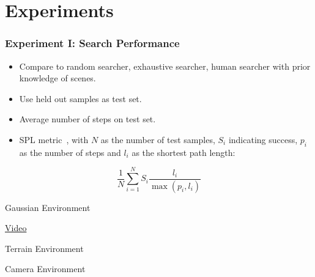 \section{Experiments}

\begin{frame}
    \frametitle{Experiment I: Search Performance}

    \begin{itemize}
        \item Compare to random searcher, exhaustive searcher, human searcher with prior knowledge of scenes.
        \item Use held out samples as test set.
        \item Average number of steps on test set.
        \item SPL metric~\cite{anderson_evaluation_2018}, with \(N\) as the number of test samples, \(S_i\) indicating success, \(p_i\) as the number of steps and \(l_i\) as the shortest path length:
    \end{itemize}

    \begin{equation}
        \frac{1}{N} \sum_{i=1}^N S_i \frac{l_i}{\max(p_i,l_i)}
    \end{equation}
\end{frame}

\begin{frame}
    \begin{table}
        \centering
        Gaussian Environment\par\vspace{0.5em}
        
    \end{table}

    \href{run:videos/earth.mp4}{Video}
\end{frame}

\begin{frame}
    \begin{table}
        \centering
        Terrain Environment\par\vspace{0.5em}
        
    \end{table}
\end{frame}

\begin{frame}
    \begin{table}
        \centering
        Camera Environment\par\vspace{0.5em}
        
    \end{table}
\end{frame}

